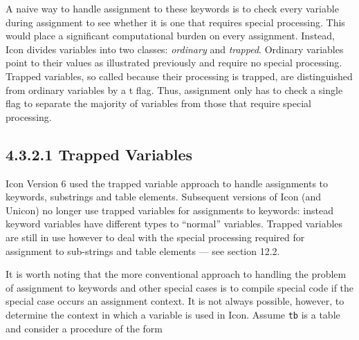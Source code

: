 A naive way to handle assignment to these keywords is to check every
variable during assignment to see whether it is one that
requires special processing. This would place a significant
computational burden on every assignment.  Instead, Icon divides
variables into two classes: \textit{ordinary} and
\textit{trapped}. Ordinary variables point to their values as
illustrated previously and require no special processing. Trapped
variables, so called because their processing is
{\textquotedbl}trapped,{\textquotedbl} are distinguished from ordinary
variables by a t flag. Thus, assignment only has to check a single
flag to separate the majority of variables from those that require
special processing.

\subsection[4.3.2.1 Trapped Variables]{4.3.2.1 Trapped Variables}

Icon Version 6 used the trapped variable approach to handle assignments to
keywords, substrings and table elements. Subsequent versions of Icon (and
Unicon) no longer use trapped variables for assignments to keywords:
instead keyword variables have different types to ``normal''
variables. Trapped variables are still in use however to deal with the
special processing required for assignment to sub-strings and table
elements --- see section 12.2.



It is worth noting that the more conventional approach to handling the
problem of assignment to keywords and other special cases is to compile
special code if the special case occurs an assignment context. It is not
always possible, however, to determine the context in which a variable is
used in Icon. Assume \texttt{tb} is a table and consider a procedure of the form

